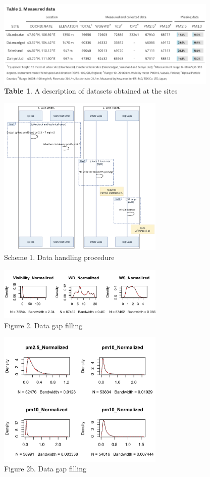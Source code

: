 \documentclass[
  11pt,
]{article}
\begin{document}
\begin{figure}
\centering
\includegraphics[width=4.16667in,height=\textheight,keepaspectratio]{images/table_1.png}
\caption{\textbf{Table 1}. A description of datasets obtained at the
sites}
\end{figure}

\newpage

\begin{figure}
\centering
\includegraphics[width=3.125in,height=\textheight,keepaspectratio]{images/scheme_1.png}
\caption{Scheme 1. Data handling procedure}
\end{figure}

\newpage

\begin{figure}
\centering
\includegraphics[width=3.125in,height=\textheight,keepaspectratio]{images/figure_2b.png}
\caption{Figure 2. Data gap filling}
\end{figure}

\begin{figure}
\centering
\includegraphics[width=3.125in,height=\textheight,keepaspectratio]{images/figure_2c.png}
\caption{Figure 2b. Data gap filling}
\end{figure}
\end{document}
